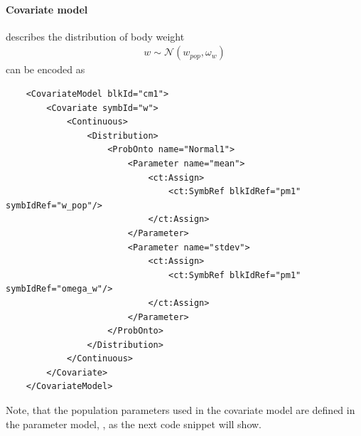 \paragraph{Covariate model} describes the distribution of body weight
\begin{align*}
 w \sim \mathcal {N}(w_{pop}, \omega_w)
\end{align*}
can be encoded as
\lstset{language=XML}
\begin{lstlisting}
    <CovariateModel blkId="cm1">
        <Covariate symbId="w">
            <Continuous>
                <Distribution>
                    <ProbOnto name="Normal1">
                        <Parameter name="mean">
                            <ct:Assign>
                                <ct:SymbRef blkIdRef="pm1" symbIdRef="w_pop"/>
                            </ct:Assign>
                        </Parameter>
                        <Parameter name="stdev">
                            <ct:Assign>
                                <ct:SymbRef blkIdRef="pm1" symbIdRef="omega_w"/>
                            </ct:Assign>
                        </Parameter>
                    </ProbOnto>
                </Distribution>
            </Continuous>
        </Covariate>
    </CovariateModel>
\end{lstlisting}
Note, that the population parameters used in the covariate model are 
defined in the parameter model, , as the next code snippet will show.
